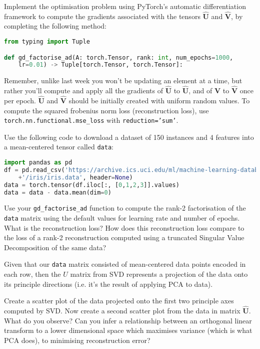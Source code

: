 \documentclass[a4paper]{article}
\begin{document}
\begin{tcolorbox}[title=1.1 Implement gradient-based factorisation using PyTorch's AD (1 mark)]
Implement the optimisation problem using PyTorch's automatic differentiation framework to compute the gradients associated with the tensors $\hat{\bm U}$ and $\hat{\bm V}$, by completing the following method:

\begin{lstlisting}[language=Python]
from typing import Tuple

def gd_factorise_ad(A: torch.Tensor, rank: int, num_epochs=1000, 
	lr=0.01) -> Tuple[torch.Tensor, torch.Tensor]:
\end{lstlisting}

Remember, unlike last week you won't be updating an element at a time, but rather you'll compute and apply all the gradients of $\hat{\bm U}$ to $\hat{\bm U}$, and of $\hat{\bm V}$ to $\hat{\bm V}$ once per epoch. $\hat{\bm U}$ and $\hat{\bm V}$ should be initially created with uniform random values. To compute the squared frobenius norm loss (reconstruction loss), use \texttt{torch.nn.functional.mse\_loss} with \texttt{reduction='sum'}.
\end{tcolorbox}

\begin{tcolorbox}[title=1.2 Factorise and compute reconstruction error on real data (1 mark)]
Use the following code to download a dataset of 150 instances and 4 features into a mean-centered tensor called \texttt{data}:

\begin{lstlisting}[language=Python]
import pandas as pd
df = pd.read_csv('https://archive.ics.uci.edu/ml/machine-learning-databases'
	+'/iris/iris.data', header=None)
data = torch.tensor(df.iloc[:, [0,1,2,3]].values)
data = data - data.mean(dim=0)
\end{lstlisting}

Use your \texttt{gd\_factorise\_ad} function to compute the rank-2 factorisation of the \texttt{data} matrix using the default values for learning rate and number of epochs. What is the reconstruction loss? How does this reconstruction loss compare to the loss of a rank-2 reconstruction computed using a truncated Singular Value Decomposition of the same data?
\end{tcolorbox}

\begin{tcolorbox}[title=1.3 Compare against PCA (1 mark)]
Given that our \texttt{data} matrix consisted of mean-centered data points encoded in each row, then the $U$ matrix from SVD represents a projection of the data onto its principle directions (i.e. it's the result of applying PCA to data).

Create a scatter plot of the data projected onto the first two principle axes computed by SVD. Now create a second scatter plot from the data in matrix $\hat{\bm U}$. What do you observe? Can you infer a relationship between an orthogonal linear transform to a lower dimensional space which maximises variance (which is what PCA does), to minimising reconstruction error?
\end{tcolorbox}
\end{document}
